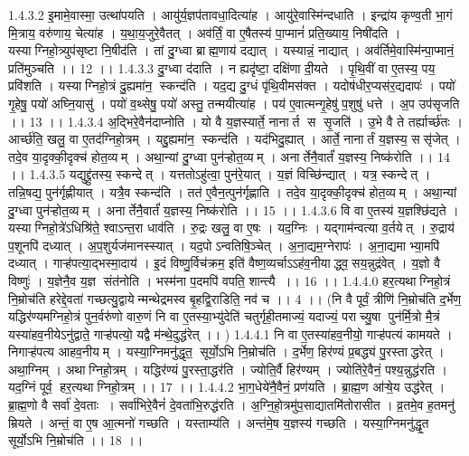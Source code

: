 1.4.3.2
इ॒मामे॒वास्मा॒ उत्था॑पयति । आयु॑र्य॒ज्ञप॑तावधा॒दित्या॑ह । आयु॑रे॒वास्मि॑न्दधाति । इन्द्रा॑य कृण्व॒ती भा॒गं मि॒त्राय॒ वरु॑णाय॒ चेत्या॑ह । य॒था॒य॒जुरे॒वैतत् । अव॑र्तिं॒ वा ए॒षैतस्य॑ पा॒प्मानं॑ प्रति॒ख्याय॒ निषी॑दति । यस्याग्निहो॒त्र्युप॑सृष्टा नि॒षीद॑ति । तां दु॒ग्ध्वा ब्राह्म॒णाय॑ दद्यात् । यस्यान्नं॒ नाद्यात् । अव॑र्तिमे॒वास्मि॑न्पा॒प्मानं॒ प्रति॑मुञ्चति ।। 12 ।।
1.4.3.3
दु॒ग्ध्वा द॑दाति । न ह्यदृ॑ष्टा॒ दक्षि॑णा दी॒यते । पृ॒थि॒वीं वा ए॒तस्य॒ पय॒ प्रवि॑शति । यस्याग्निहो॒त्रं दु॒ह्यमा॑न॒॒ स्कन्द॑ति । यद॒द्य दु॒ग्धं पृ॑थि॒वीमस॑क्त । यदोष॑धीर॒प्यस॑र॒द्यदापः॑ । पयो॑ गृ॒हेषु॒ पयो॑ अघ्नि॒यासु॑ । पयो॑ व॒थ्सेषु॒ पयो॑ अस्तु॒ तन्मयीत्या॑ह । पय॑ ए॒वात्मन्गृ॒हेषु॑ प॒शुषु॑ धत्ते । अ॒प उप॑सृजति ।। 13 ।।
1.4.3.4
अ॒द्भिरे॒वैन॑दाप्नोति । यो वै य॒ज्ञस्यार्ते॒ नानार्त स सृ॒जति॑ । उ॒भे वै ते तर्ह्यार्च्छ॑तः । आर्च्छ॑ति॒ खलु॒ वा ए॒तद॑ग्निहो॒त्रम् । यद्दु॒ह्यमा॑न॒॒ स्कन्द॑ति । यद॑भिदु॒ह्यात् । आर्ते॒ नानार्तं य॒ज्ञस्य॒ ससृ॑जेत् । तदे॒व या॒दृक्की॒दृक्च॑ होत॒व्यम् । अथा॒न्यां दु॒ग्ध्वा पुन॑ऱ्होत॒व्यम् । अनार्तेनै॒वार्तं॑ य॒ज्ञस्य॒ निष्क॑रोति ।। 14 ।।
1.4.3.5
यद्युद्द्रु॑तस्य॒ स्कन्देत् । यत्ततोऽहु॑त्वा॒ पुन॑रे॒यात् । य॒ज्ञं विच्छि॑न्द्यात् । यत्र॒ स्कन्देत् । तन्नि॒षद्य॒ पुन॑र्गृह्णीयात् । यत्रै॒व स्कन्द॑ति । तत॑ ए॒वैन॒त्पुन॑र्गृह्णाति । तदे॒व या॒दृक्की॒दृक्च॑ होत॒व्यम् । अथा॒न्यां दु॒ग्ध्वा पुन॑ऱ्होत॒व्यम् । अनार्तेनै॒वार्तं॑ य॒ज्ञस्य॒ निष्क॑रोति ।। 15 ।।
1.4.3.6
वि वा ए॒तस्य॑ य॒ज्ञश्छि॑द्यते । यस्याग्निहो॒त्रे॑ऽधिश्रि॑ते॒ श्वाऽन्त॒रा धाव॑ति । रु॒द्रः खलु॒ वा ए॒षः । यद॒ग्निः । यद्गाम॑न्वत्या व॒र्तयेत् । रु॒द्राय॑ प॒शूनपि॑ दध्यात् । अ॒प॒शुर्यज॑मानस्स्यात् । यद॒पोऽन्वतिषि॒ञ्चेत् । अ॒ना॒द्यम॒ग्नेरापः॑ । अ॒ना॒द्यमाभ्या॒मपि॑ दध्यात् । गाऱ्ह॑पत्या॒द्भस्मा॒दाय॑ । इ॒दं विष्णु॒र्विच॑क्रम॒ इति॑ वैष्ण॒व्यर्चाऽऽह॑व॒नीयाद्ध्व॒॒सय॒न्नुद्र॑वेत् । य॒ज्ञो वै विष्णुः॑ । य॒ज्ञेनै॒व य॒ज्ञ संत॑नोति । भस्म॑ना प॒दमपि॑ वपति॒ शान्त्यै ।। 16 ।।
1.4.4.0
हर॒त्यथाग्निहो॒त्रं नि॒म्रोच॑ति हरेद्दे॒वता॑ गच्छत्यु॒द्वायेन्मन्थेद्रमस्व बृ॒हद्वि॒राडिति॒ नव॑ च ।। 4 ।। (नि वै पूर्वं॒ त्रीणि॑ नि॒म्रोच॑ति द॒र्भेण॒ यद्धिर॑ण्यमग्निहो॒त्रं पुन॒र्वरु॑णो वारु॒णं नि वा ए॒तस्या॒भ्यु॑देति॑ चतुर्गृही॒तमाज्यं॒ यदाज्यं॒ पराच्यु॒षा पुन॑र्मि॒त्रो मै॒त्रं यस्या॑हव॒नीयेऽनु॑द्वाते॒ गाऱ्ह॑पत्यो॒ यद्वै म॑न्थे॒दुद्ध॑रेत् ।। )
1.4.4.1
नि वा ए॒तस्या॑हव॒नीयो॒ गाऱ्ह॑पत्यं कामयते । निगाऱ्ह॑पत्य आहव॒नीयम् । यस्या॒ग्निमनु॑द्धृत॒॒ सूर्यो॒ऽभि नि॒म्रोच॑ति । द॒र्भेण॒ हिर॑ण्यं प्र॒बद्ध्य॑ पु॒रस्ताद्धरेत् । अथा॒ग्निम् । अथाग्निहो॒त्रम् । यद्धिर॑ण्यं पु॒रस्ता॒द्धर॑ति । ज्योति॒र्वै हिर॑ण्यम् । ज्योति॑रे॒वैनं॒ पश्य॒न्नुद्ध॑रति । यद॒ग्निं पूर्व॒॒ हर॒त्यथाग्निहो॒त्रम् ।। 17 ।।
1.4.4.2
भा॒ग॒धेये॑नै॒वैनं॒ प्रण॑यति । ब्रा॒ह्म॒ण आ॑ऱ्षे॒य उद्ध॑रेत् । ब्रा॒ह्म॒णो वै सर्वा॑ दे॒वताः । सर्वा॑भिरे॒वैनं॑ दे॒वता॑भि॒रुद्ध॑रति । अ॒ग्नि॒हो॒त्रमु॑प॒साद्यातमि॑तोरासीत । व्र॒तमे॒व ह॒तमनु॑ म्रियते । अन्तं॒ वा ए॒ष आ॒त्मनो॑ गच्छति । यस्ताम्य॑ति । अन्त॑मे॒ष य॒ज्ञस्य॑ गच्छति । यस्या॒ग्निमनु॑द्धृ॒त॒ सूर्यो॒ऽभि नि॒म्रोच॑ति ।। 18 ।।

